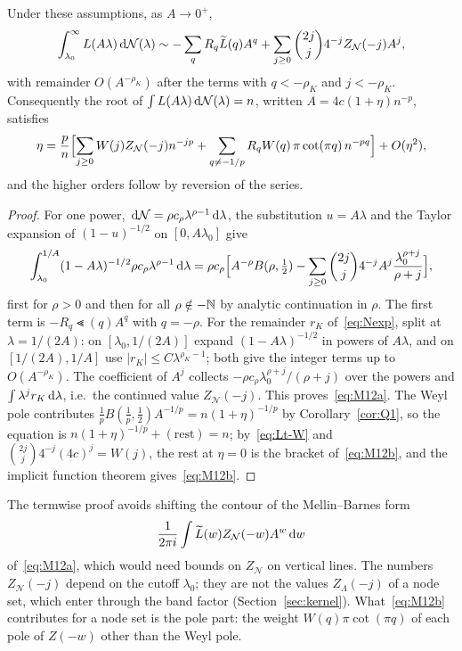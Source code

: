 \begin{proposition}\label{prop:M12}
Under these assumptions, as $A\to0^+$,
\begin{equation}\label{eq:M12a}
  \int_{\lambda_0}^\infty L(A\lambda)\,\mathrm{d}\mathcal N(\lambda)\sim-\sum_qR_q\widetilde L(q)A^q
  +\sum_{j\ge0}\binom{2j}j4^{-j}Z_{\mathcal N}(-j)A^j,
\end{equation}
with remainder $O(A^{-\rho_K})$ after the terms with $q<-\rho_K$ and $j<-\rho_K$. Consequently the root of
$\int L(A\lambda)\,\mathrm{d}\mathcal N(\lambda)=n$, written $A=4c(1+\eta)n^{-p}$, satisfies
\begin{equation}\label{eq:M12b}
  \eta=\frac pn\Bigl[\sum_{j\ge0}W(j)Z_{\mathcal N}(-j)n^{-jp}+\sum_{q\ne-1/p}R_qW(q)\,\pi\cot(\pi q)\,n^{-pq}\Bigr]
  +O(\eta^2),
\end{equation}
and the higher orders follow by reversion of the series.
\end{proposition}

\begin{proof}
For one power, $\,\mathrm{d}\mathcal N=\rho c_\rho\lambda^{\rho-1}\,\mathrm{d}\lambda$, the substitution $u=A\lambda$ and the Taylor
expansion of $(1-u)^{-1/2}$ on $[0,A\lambda_0]$ give
\[
  \int_{\lambda_0}^{1/A}(1-A\lambda)^{-1/2}\rho c_\rho\lambda^{\rho-1}\,\mathrm{d}\lambda
  =\rho c_\rho\Bigl[A^{-\rho}B(\rho,\tfrac12)-\sum_{j\ge0}\binom{2j}j4^{-j}A^j\frac{\lambda_0^{\rho+j}}{\rho+j}\Bigr],
\]
first for $\rho>0$ and then for all $\rho\notin-\mathbb{N}$ by analytic continuation in $\rho$. The first term is
$-R_q\Lt(q)A^q$ with $q=-\rho$. For the remainder $r_K$ of~\eqref{eq:Nexp}, split at $\lambda=1/(2A)$: on
$[\lambda_0,1/(2A)]$ expand $(1-A\lambda)^{-1/2}$ in powers of $A\lambda$, and on $[1/(2A),1/A]$ use
$|r_K|\le C\lambda^{\rho_K-1}$; both give the integer terms up to $O(A^{-\rho_K})$. The coefficient of $A^j$ collects
$-\rho c_\rho\lambda_0^{\rho+j}/(\rho+j)$ over the powers and $\int\lambda^jr_K\,\mathrm{d}\lambda$, i.e.\ the continued value
$Z_{\mathcal N}(-j)$. This proves~\eqref{eq:M12a}. The Weyl pole contributes $\frac1pB(\frac1p,\frac12)A^{-1/p}=n(1+\eta)^{-1/p}$
by Corollary~\ref{cor:Q1}, so the equation is $n(1+\eta)^{-1/p}+(\text{rest})=n$; by~\eqref{eq:Lt-W} and
$\binom{2j}j4^{-j}(4c)^j=W(j)$, the rest at $\eta=0$ is the bracket of~\eqref{eq:M12b}, and the implicit function
theorem gives~\eqref{eq:M12b}.
\end{proof}

The termwise proof avoids shifting the contour of the Mellin--Barnes form
\[
  \frac1{2\pi i}\int\widetilde L(w)Z_{\mathcal N}(-w)A^w\,\mathrm{d} w
\]
of~\eqref{eq:M12a}, which would need bounds on $Z_{\mathcal N}$ on vertical lines. The numbers $Z_{\mathcal N}(-j)$ depend on the cutoff $\lambda_0$; they are not the values $Z_\Lambda(-j)$
of a node set, which enter through the band factor (Section~\ref{sec:kernel}). What~\eqref{eq:M12b} contributes for a
node set is the pole part: the weight $W(q)\pi\cot(\pi q)$ of each pole of $Z(-w)$ other than the Weyl pole.

